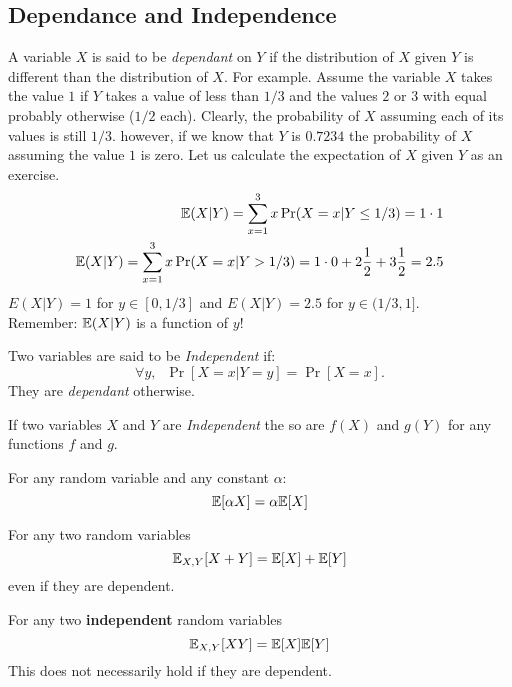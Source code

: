 \documentclass{article}
\begin{document}
\subsection{Dependance and Independence}
A variable $X$ is said to be {\it dependant} on $Y$ if the distribution of $X$ given $Y$ is different than the distribution of $X$. 
For example. Assume the variable $X$ takes the value $1$ if $Y$ takes a
value of less than $1/3$ and the values $2$ or $3$ with equal probably otherwise ($1/2$ each).
%
Clearly, the probability of $X$ assuming each of its values is still
$1/3$. however, if we know that $Y$ is $0.7234$ the probability of
$X$ assuming the value $1$ is zero. Let us calculate the expectation of $X$ given $Y$ as an exercise.
\begin{eqnarray}
{\mathbb E}(X | Y) = \sum_{x=1}^{3} x \Pr(X = x | Y \le 1/3) = 1\cdot 1\\
{\mathbb E}(X | Y) = \sum_{x=1}^{3} x \Pr(X = x | Y > 1/3) = 1\cdot 0 + 2
\frac{1}{2} + 3\frac{1}{2}  = 2.5
\end{eqnarray}
$E(X | Y) = 1$ for $y \in [0,1/3]$ and $E(X | Y) = 2.5$ for $y \in (1/3,1]$.\\
Remember: ${\mathbb E}(X | Y)$ is a function of $y$!

\begin{definition}[Independence]
Two variables are said to be {\it Independent} if:
\[
\forall y,\;\;\Pr[ X=x | Y = y] = \Pr[X=x].
\]
They are {\it dependant} otherwise.
\end{definition}


\begin{fact}
If two variables $X$ and $Y$ are {\it Independent} the so are $f(X)$ and $g(Y)$ for any functions $f$ and $g$.
\end{fact}


\begin{fact}%
For any random variable and any constant $\alpha$:
\begin{equation}
{\mathbb E}[\alpha X] = \alpha {\mathbb E}[X]
\end{equation}
\end{fact}

\begin{fact}%
For any two random variables
\begin{equation}
{\mathbb E}_{X,Y}[X+Y] = {\mathbb E}[X] + {\mathbb E}[Y]
\end{equation}
even if they are dependent.
\end{fact}


\begin{fact}%
For any two {\bf independent} random variables
\begin{equation}
{\mathbb E}_{X,Y}[XY] = {\mathbb E}[X]{\mathbb E}[Y]
\end{equation}
This does not necessarily hold if they are dependent.
\end{fact}
\end{document}
